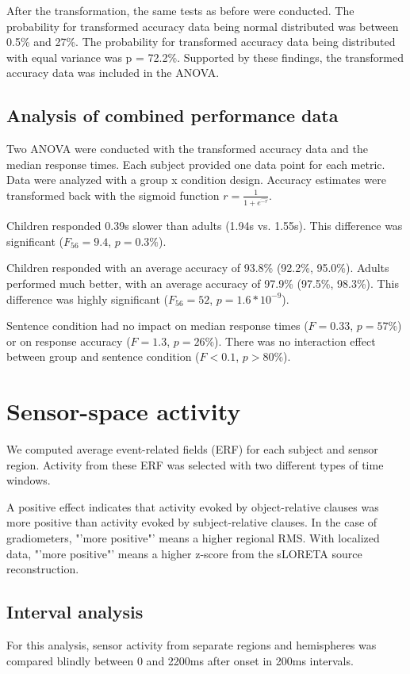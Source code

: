 After the transformation, the same tests as before were conducted.
The probability for transformed accuracy data being normal distributed was between 0.5\% and 27\%.
The probability for transformed accuracy data being distributed with equal variance was p = 72.2\%.
Supported by these findings, the transformed accuracy data was included in the ANOVA.

\subsection{Analysis of combined performance data}

Two ANOVA were conducted with the transformed accuracy data and the median response times.
Each subject provided one data point for each metric.
Data were analyzed with a group x condition design.
Accuracy estimates were transformed back with the sigmoid function $r = \frac{1}{1+e^{\hat{-r}}}$.

Children responded 0.39s slower than adults (1.94s vs. 1.55s).
This difference was significant ($F_{56} = 9.4$, $p = 0.3\%$).

Children responded with an average accuracy of 93.8\% (92.2\%, 95.0\%).
Adults performed much better, with an average accuracy of 97.9\% (97.5\%, 98.3\%).
This difference was highly significant ($F_{56} = 52$, $p = 1.6*10^{-9}$).

Sentence condition had no impact on median response times ($F = 0.33$, $p = 57\%$) or on response accuracy ($F = 1.3$, $p = 26\%$).
There was no interaction effect between group and sentence condition ($F < 0.1$, $p > 80\%$).

\section{Sensor-space activity}

We computed average event-related fields (ERF) for each subject and sensor region.
Activity from these ERF was selected with two different types of time windows.

A positive effect indicates that activity evoked by object-relative clauses was more positive than activity evoked by subject-relative clauses. In the case of gradiometers, "'more positive"' means a higher regional RMS. With localized data, "'more positive"' means a higher z-score from the sLORETA source reconstruction.


\subsection{Interval analysis}
For this analysis, sensor activity from separate regions and hemispheres was compared blindly between 0 and 2200ms after onset in 200ms intervals.

